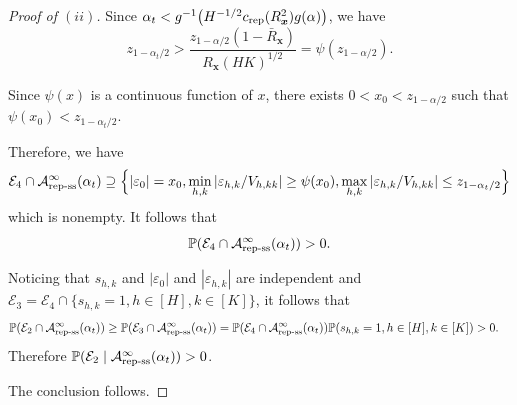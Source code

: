 \documentclass[12pt]{article}
\newcommand{\Prob}{\mathbb{P}}
\newcommand{\ma}{\mathcal{A}}
\newcommand{\repss}{\textnormal{rep-ss}}
\newcommand{\rep}{\textnormal{rep}}
\newcommand{\bs}{\boldsymbol}
\begin{document}
\begin{proof}[Proof of  $(ii)$]
Since
$\alpha_t < g^{-1}\big(H^{-1/2}c_{\rep}(R_{\bs{x}}^2)g(\alpha)\big)$, we have
\[
z_{1-\alpha_t/2} > \frac{z_{1-\alpha/2} (1- \bar{R}_{\bs{x}}) }{R_{\bs{x}} (HK)^{1/2}}  = \psi(z_{1-\alpha/2}).
\]

Since $\psi(x)$ is a continuous function of $x$, there exists $0 < x_0 < z_{1-\alpha/2}$ such that $\psi(x_0) < z_{1-\alpha_t/2}$.

Therefore, we have
\[
\mathcal{E}_4 \cap \ma^{\infty}_{\repss}(\alpha_t) \supseteq \Big\{|\varepsilon_0| = x_0,
 \min_{h,k}|\varepsilon_{h,k}/V_{h,kk}|  \geq \psi(x_0), \max_{h,k}|\varepsilon_{h,k}/V_{h,kk}| \leq z_{1-\alpha_t/2} \Big\}
\]
which is nonempty. It follows that
\[
\Prob(\mathcal{E}_4 \cap \ma^{\infty}_{\repss}(\alpha_t)) >0.
\]

Noticing that $s_{h,k}$ and $|\varepsilon_0|$ and $|\varepsilon_{h,k}|$ are independent and $\mathcal{E}_3 = \mathcal{E}_4 \cap \big\{s_{h,k}=1, h\in [H], k \in [K]\big\}$, it follows that
\begin{align*}
    &\Prob(\mathcal{E}_2 \cap \ma^{\infty}_{\repss}(\alpha_t) ) \geq 
 \Prob( \mathcal{E}_3 \cap \ma^{\infty}_{\repss}(\alpha_t))
 =  \Prob(\mathcal{E}_4 \cap \ma^{\infty}_{\repss}(\alpha_t)) \Prob(s_{h,k}=1, h\in [H], k \in [K]) > 0.
\end{align*}
Therefore $\Prob(\mathcal{E}_2 \mid \ma^{\infty}_{\repss}(\alpha_t) ) >0 $.

The conclusion follows.
\end{proof}
\end{document}
